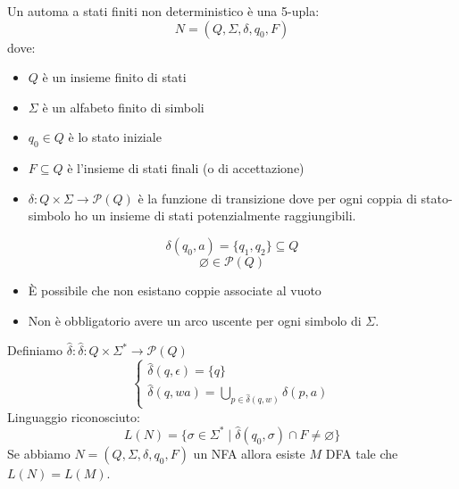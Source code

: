 \documentclass[a4paper]{article}
\begin{document}
\dfn{}
{
    Un automa a stati finiti non deterministico è una 5-upla:
    \[N = (Q, \Sigma, \delta, q_0, F)\]
    dove:
    \begin{itemize}
        \item $Q$ è un insieme finito di stati
        \item $\Sigma$ è un alfabeto finito di simboli
        \item $q_0 \in Q$ è lo stato iniziale
        \item $F \subseteq Q$ è l'insieme di stati finali (o di accettazione)
        \item $\delta : Q \times \Sigma \rightarrow \mathcal{P}(Q)$ è la funzione di transizione dove 
        per ogni coppia di stato-simbolo ho un insieme di stati potenzialmente raggiungibili.
    \end{itemize}
}
\begin{figure}[H]
    \centering
  \end{figure}   
  \[\delta(q_0, a) = \{q_1, q_2\} \subseteq Q\]
  \[ \varnothing \in \mathcal{P}(Q)\]
  \begin{itemize}
    \item È possibile che non esistano coppie associate al vuoto
    \item Non è obbligatorio avere un arco uscente per ogni simbolo di $\Sigma$.
  \end{itemize}
    \noindent
    Definiamo $\hat{\delta}: \hat{\delta}: Q \times \Sigma^* \rightarrow \mathcal{P}(Q)$
    \[
    \begin{cases}
        \hat{\delta}(q, \epsilon) = \{q\}\\
        \hat{\delta}(q, w a) = \bigcup_{p \in \hat{\delta}(q,w)} \delta(p, a)
    \end{cases}
    \]
    Linguaggio riconosciuto:
    \[L(N) = \{\sigma \in \Sigma^* \; | \; \hat{\delta}(q_0, \sigma) \cap F \neq \varnothing \}\]
    {
        Se abbiamo $N = (Q, \Sigma, \delta, q_0, F)$ un NFA allora esiste 
        $M$ DFA tale che $L(N) = L(M)$.
    }
\end{document}
